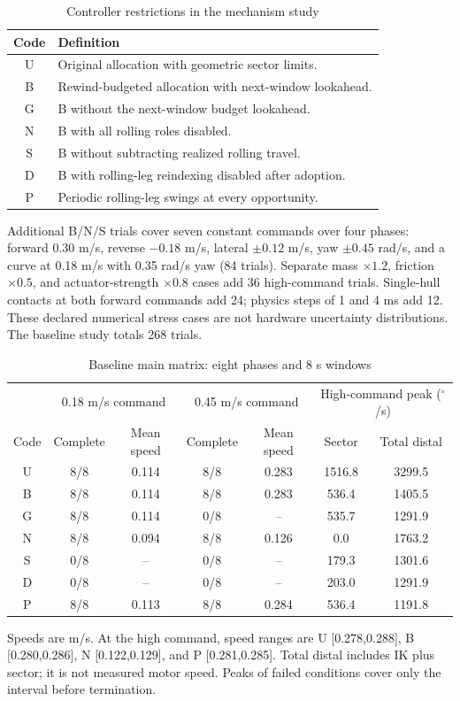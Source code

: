 \documentclass[letterpaper,10pt,conference]{ieeeconf}
\begin{document}
\begin{table}[t]\centering\small
\caption{Controller restrictions in the mechanism study}
\label{tab:conditions}
\begin{tabular}{cp{6.7cm}}\toprule
Code & Definition\\\midrule
U & Original allocation with geometric sector limits.\\
B & Rewind-budgeted allocation with next-window lookahead.\\
G & B without the next-window budget lookahead.\\
N & B with all rolling roles disabled.\\
S & B without subtracting realized rolling travel.\\
D & B with rolling-leg reindexing disabled after adoption.\\
P & Periodic rolling-leg swings at every opportunity.\\\bottomrule
\end{tabular}\end{table}

Additional B/N/S trials cover seven constant commands over four phases: forward 0.30 m/s, reverse $-0.18$ m/s, lateral $\pm0.12$ m/s, yaw $\pm0.45$ rad/s, and a curve at 0.18 m/s with 0.35 rad/s yaw (84 trials). Separate mass $\times1.2$, friction $\times0.5$, and actuator-strength $\times0.8$ cases add 36 high-command trials. Single-hull contacts at both forward commands add 24; physics steps of 1 and 4 ms add 12. These declared numerical stress cases are not hardware uncertainty distributions. The baseline study totals 268 trials.

\begin{table}[t]\centering\small
\caption{Baseline main matrix: eight phases and 8 s windows}
\label{tab:main}
\begin{tabular}{ccccccc}\toprule
 & \multicolumn{2}{c}{0.18 m/s command} & \multicolumn{2}{c}{0.45 m/s command} & \multicolumn{2}{c}{High-command peak ($^\circ$/s)}\\
Code & Complete & Mean speed & Complete & Mean speed & Sector & Total distal\\\midrule
U & 8/8 & 0.114 & 8/8 & 0.283 & 1516.8 & 3299.5\\
B & 8/8 & 0.114 & 8/8 & 0.283 & 536.4 & 1405.5\\
G & 8/8 & 0.114 & 0/8 & -- & 535.7 & 1291.9\\
N & 8/8 & 0.094 & 8/8 & 0.126 & 0.0 & 1763.2\\
S & 0/8 & -- & 0/8 & -- & 179.3 & 1301.6\\
D & 0/8 & -- & 0/8 & -- & 203.0 & 1291.9\\
P & 8/8 & 0.113 & 8/8 & 0.284 & 536.4 & 1191.8\\\bottomrule
\end{tabular}
\par\vspace{5pt}\noindent\parbox{.96\textwidth}{\footnotesize Speeds are m/s. At the high command, speed ranges are U [0.278,0.288], B [0.280,0.286], N [0.122,0.129], and P [0.281,0.285]. Total distal includes IK plus sector; it is not measured motor speed. Peaks of failed conditions cover only the interval before termination.}
\end{table}
\end{document}
